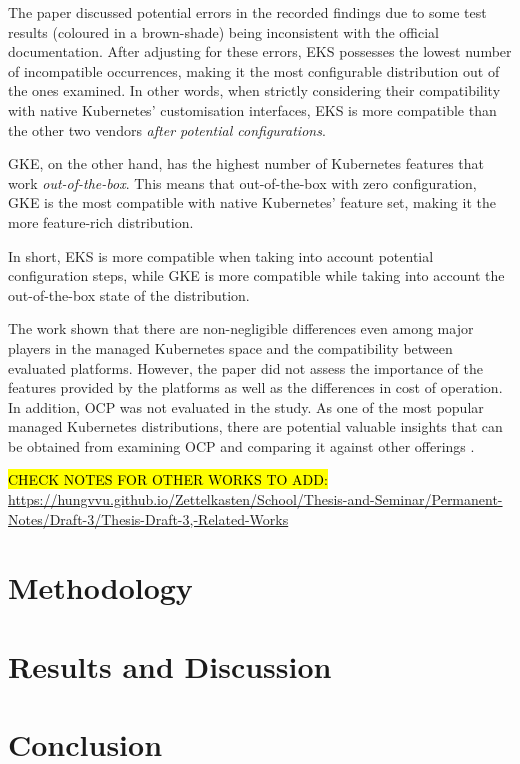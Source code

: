 The paper discussed potential errors in the recorded findings due to some test results (coloured in a brown-shade) being inconsistent with the official documentation. After adjusting for these errors, EKS possesses the lowest number of incompatible occurrences, making it the most configurable distribution out of the ones examined. In other words, when strictly considering their compatibility with native Kubernetes' customisation interfaces, EKS is more compatible than the other two vendors \textit{after potential configurations}.

GKE, on the other hand, has the highest number of Kubernetes features that work \textit{out-of-the-box}. This means that out-of-the-box with zero configuration, GKE is the most compatible with native Kubernetes' feature set, making it the more feature-rich distribution.

In short, EKS is more compatible when taking into account potential configuration steps, while GKE is more compatible while taking into account the out-of-the-box state of the distribution.

The work shown that there are non-negligible differences even among major players in the managed Kubernetes space and the compatibility between evaluated platforms. However, the paper did not assess the importance of the features provided by the platforms as well as the differences in cost of operation. In addition, OCP was not evaluated in the study. As one of the most popular managed Kubernetes distributions, there are potential valuable insights that can be obtained from examining OCP and comparing it against other offerings \cite{redhatinc.StateKubernetesSecurity2024, vrabicDigitalTwinsUnderstanding2018, portworxKubernetesAdoptionSurvey2021, broadcomStateKubernetes20232023}.

\hl{CHECK NOTES FOR OTHER WORKS TO ADD:} \url{https://hungvvu.github.io/Zettelkasten/School/Thesis-and-Seminar/Permanent-Notes/Draft-3/Thesis-Draft-3,-Related-Works}

\chapter{Methodology}


\chapter{Results and Discussion}


\chapter{Conclusion}

